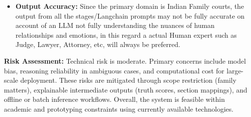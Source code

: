 \begin{itemize}
	\item \textbf{Output Accuracy:}
	Since the primary domain is Indian Family courts, the output from all the stages/Langchain prompts may not be fully accurate on account of an LLM not fully understanding the nuances of human relationships and emotions, in this regard a actual Human expert such as Judge, Lawyer, Attorney, etc, will always be preferred.
\end{itemize}

\textbf{Risk Assessment:}
Technical risk is moderate. Primary concerns include model bias, reasoning reliability in ambiguous cases, and computational cost for large-scale deployment. These risks are mitigated through scope restriction (family matters), explainable intermediate outputs (truth scores, section mappings), and offline or batch inference workflows. Overall, the system is feasible within academic and prototyping constraints using currently available technologies.






